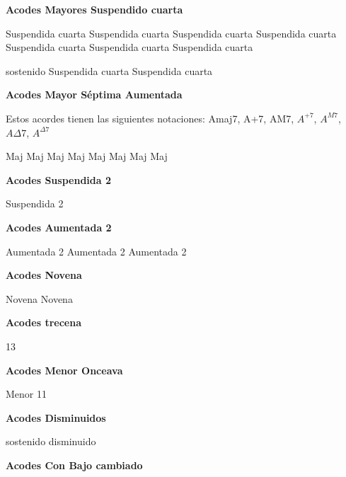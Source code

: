 \vskip 20pt
\textbf{Acodes Mayores Suspendido cuarta}
\vskip 25pt

\small
{} Suspendida cuarta
 Suspendida cuarta
 Suspendida cuarta
 Suspendida cuarta
 Suspendida cuarta
 Suspendida cuarta
 Suspendida cuarta

 sostenido Suspendida cuarta
 Suspendida cuarta
\normalsize

\vskip 20pt
\textbf{Acodes Mayor S\'eptima Aumentada}
\vskip 25pt

Estos acordes tienen las siguientes notaciones:
Amaj7, A+7, AM7, $A^{+7}$, $A^{M7}$, $A\Delta7$, $A^{\Delta7}$\break
\vskip 20pt

\small
{} Maj
 Maj
 Maj
 Maj
 Maj
 Maj
 Maj
 Maj
\normalsize

\vskip 20pt
\textbf{Acodes Suspendida 2}
\vskip 25pt

\small
{} Suspendida 2
\normalsize

\vskip 20pt
\textbf{Acodes Aumentada 2}
\vskip 25pt

\small
{} Aumentada 2
 Aumentada 2
 Aumentada 2
\normalsize

\vskip 20pt
\textbf{Acodes Novena}
\vskip 25pt

\small
{} Novena
 Novena
\normalsize

\vskip 20pt
\textbf{Acodes trecena}
\vskip 25pt

\small
{} 13
\normalsize

\vskip 20pt
\textbf{Acodes Menor Onceava}
\vskip 25pt

\small
{} Menor 11
\normalsize

\vskip 20pt
\textbf{Acodes Disminuidos}
\vskip 25pt

\small
{} sostenido disminuido
\normalsize


\vskip 20pt
\textbf{Acodes Con Bajo cambiado}

